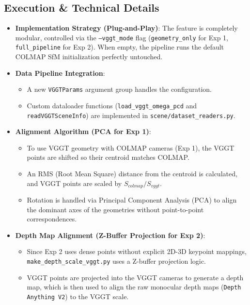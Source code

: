\subsection{Execution \& Technical Details}
\begin{itemize}
    \item \textbf{Implementation Strategy (Plug-and-Play)}: The feature is completely modular, controlled via the \texttt{--vggt\_mode} flag (\texttt{geometry\_only} for Exp 1, \texttt{full\_pipeline} for Exp 2). When empty, the pipeline runs the default COLMAP SfM initialization perfectly untouched.
    \item \textbf{Data Pipeline Integration}:
    \begin{itemize}
        \item A new \texttt{VGGTParams} argument group handles the configuration.
        \item Custom dataloader functions (\texttt{load\_vggt\_omega\_pcd} and \texttt{readVGGTSceneInfo}) are implemented in \texttt{scene/dataset\_readers.py}.
    \end{itemize}
    \item \textbf{Alignment Algorithm (PCA for Exp 1)}:
    \begin{itemize}
        \item To use VGGT geometry with COLMAP cameras (Exp 1), the VGGT points are shifted so their centroid matches COLMAP.
        \item An RMS (Root Mean Square) distance from the centroid is calculated, and VGGT points are scaled by $S_{colmap} / S_{vggt}$.
        \item Rotation is handled via Principal Component Analysis (PCA) to align the dominant axes of the geometries without point-to-point correspondences.
    \end{itemize}
    \item \textbf{Depth Map Alignment (Z-Buffer Projection for Exp 2)}:
    \begin{itemize}
        \item Since Exp 2 uses dense points without explicit 2D-3D keypoint mappings, \texttt{make\_depth\_scale\_vggt.py} uses a Z-buffer projection logic.
        \item VGGT points are projected into the VGGT cameras to generate a depth map, which is then used to align the raw monocular depth maps (\texttt{Depth Anything V2}) to the VGGT scale.
    \end{itemize}
\end{itemize}

